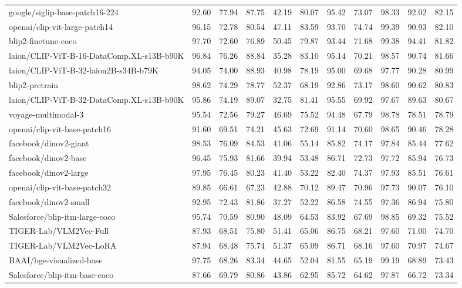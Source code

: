 \begin{table*}
{\begin{tabular}{lcccccccccc}
google/siglip-base-patch16-224 &92.60 &77.94 &87.75 &42.19 &80.07 &95.42 &73.07 &98.33 &92.02 &82.15 \\
openai/clip-vit-large-patch14 &96.15 &72.78 &80.54 &47.11 &83.59 &93.70 &74.74 &99.39 &90.93 &82.10 \\
blip2-finetune-coco &97.70 &72.60 &76.89 &50.45 &79.87 &93.44 &71.68 &99.38 &94.41 &81.82 \\
laion/CLIP-ViT-B-16-DataComp.XL-s13B-b90K &96.84 &76.26 &88.84 &35.28 &83.10 &95.14 &70.21 &98.57 &90.74 &81.66 \\
laion/CLIP-ViT-B-32-laion2B-s34B-b79K &94.05 &74.00 &88.93 &40.98 &78.19 &95.00 &69.68 &97.77 &90.28 &80.99 \\
blip2-pretrain &98.62 &74.29 &78.77 &52.37 &68.19 &92.86 &73.17 &98.60 &90.62 &80.83 \\
laion/CLIP-ViT-B-32-DataComp.XL-s13B-b90K &95.86 &74.19 &89.07 &32.75 &81.41 &95.55 &69.92 &97.67 &89.63 &80.67 \\
voyage-multimodal-3 &95.54 &72.56 &79.27 &46.69 &75.52 &94.48 &67.79 &98.78 &78.51 &78.79 \\
openai/clip-vit-base-patch16 &91.60 &69.51 &74.21 &45.63 &72.69 &91.14 &70.60 &98.65 &90.46 &78.28 \\
facebook/dinov2-giant &98.53 &76.09 &84.53 &41.06 &55.14 &85.82 &74.17 &97.84 &85.44 &77.62 \\
facebook/dinov2-base &96.45 &75.93 &81.66 &39.94 &53.48 &86.71 &72.73 &97.72 &85.94 &76.73 \\
facebook/dinov2-large &97.95 &76.45 &80.23 &41.40 &53.22 &82.40 &74.37 &97.93 &85.51 &76.61 \\
openai/clip-vit-base-patch32 &89.85 &66.61 &67.23 &42.88 &70.12 &89.47 &70.96 &97.73 &90.07 &76.10 \\
facebook/dinov2-small &92.95 &72.43 &81.86 &37.27 &52.22 &86.58 &74.55 &97.36 &86.94 &75.80 \\
Salesforce/blip-itm-large-coco &95.74 &70.59 &80.90 &48.09 &64.53 &83.92 &67.69 &98.85 &69.32 &75.52 \\
TIGER-Lab/VLM2Vec-Full &87.93 &68.51 &75.80 &51.41 &65.06 &86.75 &68.21 &97.60 &71.00 &74.70 \\
TIGER-Lab/VLM2Vec-LoRA &87.94 &68.48 &75.74 &51.37 &65.09 &86.71 &68.16 &97.60 &70.97 &74.67 \\
BAAI/bge-visualized-base &97.75 &68.26 &83.34 &44.65 &52.04 &81.55 &65.19 &99.19 &68.89 &73.43 \\
Salesforce/blip-itm-base-coco &87.66 &69.79 &80.86 &43.86 &62.95 &85.72 &64.62 &97.87 &66.72 &73.34 \\

\end{tabular}}
\end{table*}
